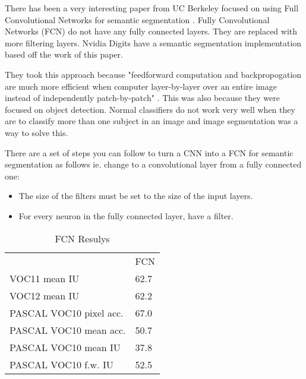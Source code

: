There has been a very interesting paper from UC Berkeley focused on using Full Convolutional
Networks for semantic segmentation \parencite{fcn}. Fully Convolutional Networks
(FCN)
do not have any fully connected layers. They are replaced with more filtering
layers. Nvidia Digits have a semantic segmentation implementation based off the
work of this paper.

They took this approach because "feedforward computation and backpropogation are
much more efficient when computer layer-by-layer over an entire image instead of
independently patch-by-patch" \parencite{fcn}. This was also because they
were focused on object detection. Normal classifiers do not work very well when
they are to classify more than one subject in an image and image segmentation
was a way to solve this.

There are a set of steps you can follow to turn a CNN into a FCN for semantic
segmentation as follows ie. change to a convolutional layer from a fully
connected one:
\begin{itemize}
    \item{The size of the filters must be set to the size of the input layers.}
    \item{For every neuron in the fully connected layer, have a filter.}
\end{itemize}

\begin{table}[]
\centering
\caption{FCN Resulys \parencite{fcn}}
\label{fcn}
\begin{tabular}{ll}
                        & FCN  \\
VOC11 mean IU           & 62.7 \\
VOC12 mean IU           & 62.2 \\
PASCAL VOC10 pixel acc. & 67.0 \\
PASCAL VOC10 mean acc.  & 50.7 \\
PASCAL VOC10 mean IU    & 37.8 \\
PASCAL VOC10 f.w. IU    & 52.5
\end{tabular}
\end{table}

